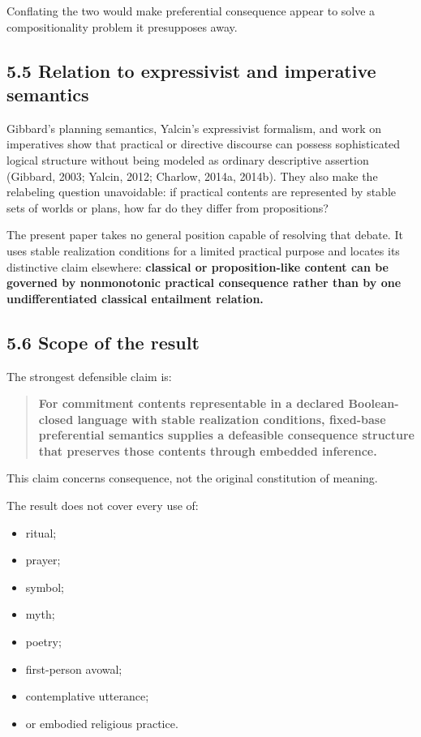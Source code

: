 \documentclass[
  11pt,
]{article}
\providecommand{\tightlist}{%
  \setlength{\itemsep}{0pt}\setlength{\parskip}{0pt}}
\begin{document}
Conflating the two would make preferential consequence appear to solve a
compositionality problem it presupposes away.

\subsection{5.5 Relation to expressivist and imperative
semantics}\label{relation-to-expressivist-and-imperative-semantics}

Gibbard's planning semantics, Yalcin's expressivist formalism, and work
on imperatives show that practical or directive discourse can possess
sophisticated logical structure without being modeled as ordinary
descriptive assertion (Gibbard, 2003; Yalcin, 2012; Charlow, 2014a,
2014b). They also make the relabeling question unavoidable: if practical
contents are represented by stable sets of worlds or plans, how far do
they differ from propositions?

The present paper takes no general position capable of resolving that
debate. It uses stable realization conditions for a limited practical
purpose and locates its distinctive claim elsewhere: \textbf{classical
or proposition-like content can be governed by nonmonotonic practical
consequence rather than by one undifferentiated classical entailment
relation.}

\subsection{5.6 Scope of the result}\label{scope-of-the-result}

The strongest defensible claim is:

\begin{quote}
\textbf{For commitment contents representable in a declared
Boolean-closed language with stable realization conditions, fixed-base
preferential semantics supplies a defeasible consequence structure that
preserves those contents through embedded inference.}
\end{quote}

This claim concerns consequence, not the original constitution of
meaning.

The result does not cover every use of:

\begin{itemize}
\tightlist
\item
  ritual;
\item
  prayer;
\item
  symbol;
\item
  myth;
\item
  poetry;
\item
  first-person avowal;
\item
  contemplative utterance;
\item
  or embodied religious practice.
\end{itemize}
\end{document}
